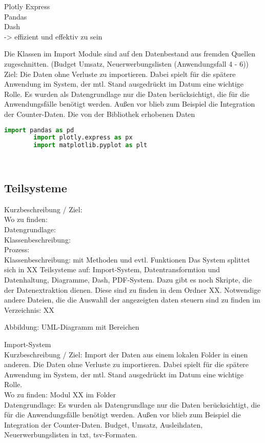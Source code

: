     
    Plotly Express\\
    Pandas\\
    Dash\\
    -> effizient und effektiv zu sein


Die Klassen im Import Module sind auf den Datenbestand aus fremden Quellen zugeschnitten.
(Budget Umsatz, Neuerwerbungslisten (Anwendungsfall 4 - 6))
Ziel: Die Daten ohne Verluste zu importieren. Dabei spielt für die spätere Anwendung im System, der mtl. Stand
ausgedrückt im Datum eine wichtige Rolle.
Es wurden als Datengrundlage nur die Daten berücksichtigt, die für die Anwendungsfälle benötigt werden.
Außen vor blieb zum Beispiel die Integration der Counter-Daten.
Die von der Bibliothek erhobenen Daten 

    \begin{lstlisting}[language=Python, caption=Python example]
        import pandas as pd
        import plotly.express as px
        import matplotlib.pyplot as plt

        
    \end{lstlisting}

    \subsection{Teilsysteme}
    
    Kurzbeschreibung / Ziel:\\
    Wo zu finden:\\
    Datengrundlage:\\
    Klassenbeschreibung:\\
    Prozess:\\
    
    Klassenbeschreibung: mit Methoden und evtl. Funktionen
    Das System splittet sich in XX Teilsysteme auf: Import-System, Datentransformtion und Datenhaltung, Diagramme, Dash, PDF-System. Dazu gibt es noch Skripte,
    die der Datenextraktion dienen. Diese sind zu finden in dem Ordner XX. Notwendige andere Dateien, die die Auswahll der angezeigten daten steuern sind zu finden im Verzeichnis: XX
    
    Abbildung: UML-Diagramm mit Bereichen
    
    Import-System\\
    Kurzbeschreibung / Ziel: Import der Daten aus einem lokalen Folder in einen anderen. 
    Die Daten ohne Verluste zu importieren. Dabei spielt für die spätere Anwendung im System, der mtl. Stand ausgedrückt im Datum eine wichtige Rolle.\\
    Wo zu finden: Modul XX im Folder \\
    Datengrundlage: Es wurden als Datengrundlage nur die Daten berücksichtigt, die für die Anwendungsfälle benötigt werden.
    Außen vor blieb zum Beispiel die Integration der Counter-Daten.
    Budget, Umsatz, Ausleihdaten, Neuerwerbungslisten in txt, tsv-Formaten.
    
